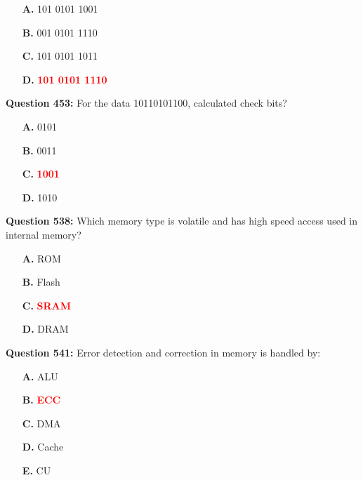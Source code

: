 \documentclass[12pt,a4paper]{article}
\begin{document}
\begin{itemize}
    \item[\textbf{A.}] 101 0101 1001
    \item[\textbf{B.}] 001 0101 1110
    \item[\textbf{C.}] 101 0101 1011
    \item[\textbf{D.}] \textcolor{red}{\textbf{101 0101 1110}}
\end{itemize}

\vspace{0.5cm}

\vspace{0.5cm}

\textbf{Question 453:} For the data 10110101100, calculated check bits?

\begin{itemize}
    \item[\textbf{A.}] 0101
    \item[\textbf{B.}] 0011
    \item[\textbf{C.}] \textcolor{red}{\textbf{1001}}
    \item[\textbf{D.}] 1010
\end{itemize}

\vspace{0.5cm}

\vspace{0.5cm}



\textbf{Question 538:} Which memory type is volatile and has high speed access used in internal memory?

\begin{itemize}
    \item[\textbf{A.}] ROM
    \item[\textbf{B.}] Flash
    \item[\textbf{C.}] \textcolor{red}{\textbf{SRAM}}
    \item[\textbf{D.}] DRAM
\end{itemize}

\textbf{Question 541:} Error detection and correction in memory is handled by:

\begin{itemize}
    \item[\textbf{A.}] ALU
    \item[\textbf{B.}] \textcolor{red}{\textbf{ECC}}
    \item[\textbf{C.}] DMA
    \item[\textbf{D.}] Cache
    \item[\textbf{E.}] CU
\end{itemize}
\end{document}
